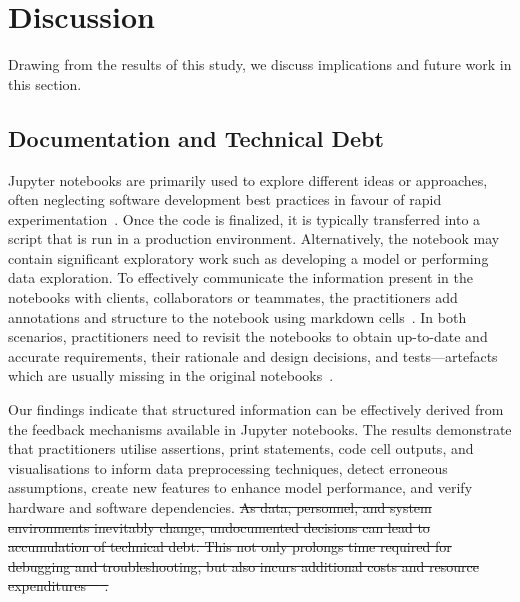 \documentclass[smallextended]{svjour3}       %
\providecommand{\DIFdel}[1]{{\protect\color{red}\sout{#1}}} %
\providecommand{\DIFaddbegin}{} %
\providecommand{\DIFaddend}{} %
\providecommand{\DIFdelbegin}{} %
\newcommand{\DIFscaledelfig}{0.5}
\newlength{\DIFdelgraphicswidth} %
\newlength{\DIFdelgraphicsheight} %
\newcommand{\DIFaddincludegraphics}[2][]{{\color{blue}\fbox{\DIFOincludegraphics[#1]{#2}}}} %
\newcommand{\DIFdelincludegraphics}[2][]{%
\sbox{\DIFdelgraphicsbox}{\DIFOincludegraphics[#1]{#2}}%
\settoboxwidth{\DIFdelgraphicswidth}{\DIFdelgraphicsbox} %
\settoboxtotalheight{\DIFdelgraphicsheight}{\DIFdelgraphicsbox} %
\scalebox{\DIFscaledelfig}{%
\parbox[b]{\DIFdelgraphicswidth}{\usebox{\DIFdelgraphicsbox}\\[-\baselineskip] \rule{\DIFdelgraphicswidth}{0em}}\llap{\resizebox{\DIFdelgraphicswidth}{\DIFdelgraphicsheight}{%
\setlength{\unitlength}{\DIFdelgraphicswidth}%
\begin{picture}(1,1)%
\thicklines\linethickness{2pt} %
{\color[rgb]{1,0,0}\put(0,0){\framebox(1,1){}}}%
{\color[rgb]{1,0,0}\put(0,0){\line( 1,1){1}}}%
{\color[rgb]{1,0,0}\put(0,1){\line(1,-1){1}}}%
\end{picture}%
}\hspace*{3pt}}} %
} %
\DeclareRobustCommand{\DIFaddbegin}{\DIFOaddbegin \let\includegraphics\DIFaddincludegraphics} %
\DeclareRobustCommand{\DIFaddend}{\DIFOaddend \let\includegraphics\DIFOincludegraphics} %
\DeclareRobustCommand{\DIFdelbegin}{\DIFOdelbegin \let\includegraphics\DIFdelincludegraphics} %
\begin{document}
\section{Discussion}\label{sec:discuss}

Drawing from the results of this study, we discuss implications and future work in this section.

\DIFaddbegin 

\DIFaddend \subsection{Documentation and Technical Debt}

Jupyter notebooks are primarily used to explore different ideas or approaches, often neglecting software development best practices in favour of rapid experimentation~\citep{kery2018story,rule2018exploration,pimentel2019large-scale}. Once the code is finalized, it is typically transferred into a script that is run in a production environment. Alternatively, the notebook may contain significant exploratory work such as developing a model or performing data exploration. To effectively communicate the information present in the notebooks with clients, collaborators or teammates, the practitioners add annotations and structure to the notebook using markdown cells~\citep{kery2018story,rule2018exploration}. In both scenarios, practitioners need to revisit the notebooks to obtain up-to-date and accurate requirements, their rationale and design decisions, and tests---artefacts which are usually missing in the original notebooks~\citep{pimentel2019large-scale,psallidas2019data,grotov2022large-scale}.

Our findings indicate that structured information can be effectively derived from the feedback mechanisms available in Jupyter notebooks. The results demonstrate that practitioners utilise assertions, print statements, code cell outputs, and visualisations to inform data preprocessing techniques, detect erroneous assumptions, create new features to enhance model performance, and verify hardware and software dependencies. \DIFdelbegin \DIFdel{As data, personnel, and system environments inevitably change, undocumented decisions can lead to accumulation of technical debt. This not only prolongs time required for debugging and troubleshooting, but also incurs additional costs and resource expenditures~\mbox{%
\citep{sculley2015hidden,amershi2019software,sambasivan2021everyone}}\hskip0pt%
.
}%
\end{document}
